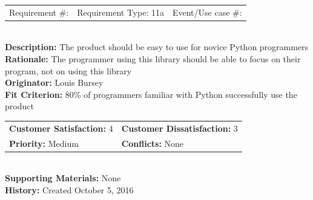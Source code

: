 \documentclass[12pt, titlepage]{article}
\begin{document}
%
%
\begin{reqbox}
\begin{tabular}{ccc}
Requirement \#: & Requirement Type: 11a & Event/Use case \#: \\
\end{tabular} \\
\textbf{Description:} The product should be easy to use for novice Python programmers \\
\textbf{Rationale:} The programmer using this library should be able to focus on their program, not on using this library \\
\textbf{Originator:} Louis Bursey\\
\textbf{Fit Criterion:} 80\% of programmers familiar with Python successfully use the product  \\
\begin{tabular}{ll}
\textbf{Customer Satisfaction:} 4 & \textbf{Customer Dissatisfaction:} 3 \\
\textbf{Priority:} Medium & \textbf{Conflicts:} None\\
\end{tabular} \\
\textbf{Supporting Materials:} None \\
\textbf{History:} Created October 5, 2016
\end{reqbox}
\end{document}
